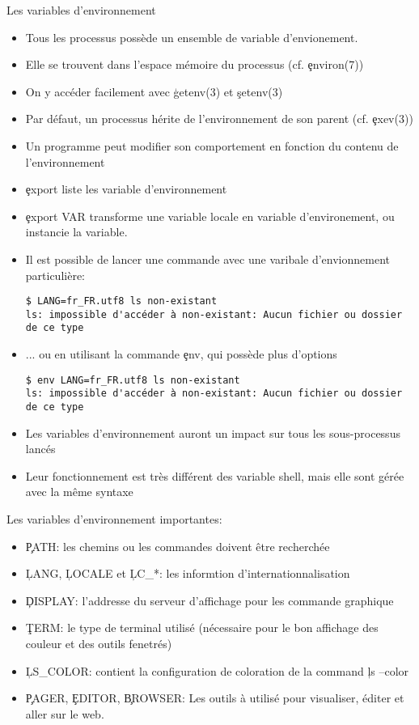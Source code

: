 \begin{frame}[fragile=singleslide]{Les variables d'environnement}
  \begin{itemize}
  \item Tous les processus possède un ensemble de variable d'envionement.
  \item Elle se trouvent dans l'espace mémoire du processus (cf. \c{environ(7)})
  \item On y accéder facilement avec \c{getenv(3)} et \c{setenv(3)}
  \item Par défaut, un processus hérite de l'environnement de son
    parent (cf. \c{exev(3)})
  \item Un programme peut modifier son comportement en fonction du
    contenu de l'environnement
  \item \c{export} liste les variable d'environnement
  \item \c{export VAR} transforme une variable locale en variable
    d'environement, ou instancie la variable.
  \item Il est possible de lancer une commande avec une varibale
    d'envionnement particulière:
    \begin{lstlisting}
$ LANG=fr_FR.utf8 ls non-existant
ls: impossible d'accéder à non-existant: Aucun fichier ou dossier de ce type
    \end{lstlisting}
  \item ... ou en utilisant la commande \c{env}, qui possède plus d'options
    \begin{lstlisting}
$ env LANG=fr_FR.utf8 ls non-existant
ls: impossible d'accéder à non-existant: Aucun fichier ou dossier de ce type
    \end{lstlisting}
  \item Les variables d'environnement auront un impact sur tous les
    sous-processus lancés
  \item Leur fonctionnement est très différent des variable shell,
    mais elle sont gérée avec la même syntaxe
  \end{itemize}
  Les variables d'environnement importantes:
  \begin{itemize}
  \item \c{PATH}: les chemins ou les commandes doivent être recherchée
  \item \c{LANG}, \c{LOCALE} et \c{LC_*}: les informtion
    d'internationnalisation
  \item \c{DISPLAY}: l'addresse du serveur d'affichage pour les
    commande graphique
  \item \c{TERM}: le type de terminal utilisé (nécessaire pour le bon
    affichage des couleur et des outils fenetrés)
  \item \c{LS_COLOR}: contient la configuration de coloration de la
    command \c{ls --color}
  \item \c{PAGER}, \c{EDITOR}, \c{BROWSER}: Les outils à utilisé pour
    visualiser, éditer et aller sur le web.
  \end{itemize}
\end{frame}

